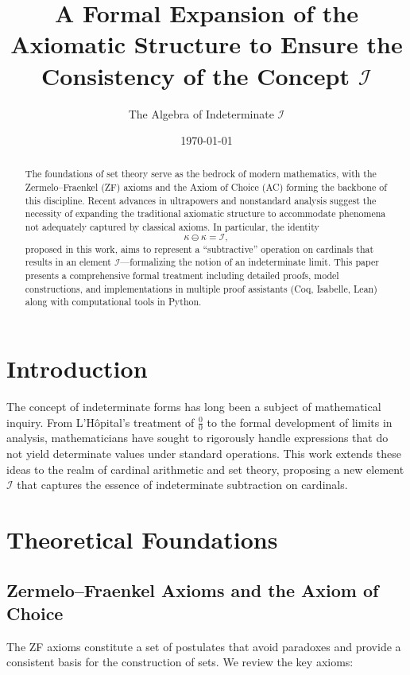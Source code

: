 \documentclass[12pt,a4paper]{article}
\title{A Formal Expansion of the Axiomatic Structure to Ensure the Consistency of the Concept $\mathcal{I}$}
\author{The Algebra of Indeterminate $\mathcal{I}$}
\date{\today}
\theoremstyle{definition}
\theoremstyle{remark}
\begin{document}
\maketitle

\begin{abstract}
The foundations of set theory serve as the bedrock of modern mathematics, with the Zermelo--Fraenkel (ZF) axioms and the Axiom of Choice (AC) forming the backbone of this discipline. Recent advances in ultrapowers and nonstandard analysis suggest the necessity of expanding the traditional axiomatic structure to accommodate phenomena not adequately captured by classical axioms. In particular, the identity
\[
\kappa \ominus \kappa = \mathcal{I},
\]
proposed in this work, aims to represent a ``subtractive'' operation on cardinals that results in an element $\mathcal{I}$---formalizing the notion of an indeterminate limit. This paper presents a comprehensive formal treatment including detailed proofs, model constructions, and implementations in multiple proof assistants (Coq, Isabelle, Lean) along with computational tools in Python.
\end{abstract}

\tableofcontents

\section{Introduction}

The concept of indeterminate forms has long been a subject of mathematical inquiry. From L'Hôpital's treatment of $\frac{0}{0}$ to the formal development of limits in analysis, mathematicians have sought to rigorously handle expressions that do not yield determinate values under standard operations. This work extends these ideas to the realm of cardinal arithmetic and set theory, proposing a new element $\mathcal{I}$ that captures the essence of indeterminate subtraction on cardinals.

\section{Theoretical Foundations}

\subsection{Zermelo--Fraenkel Axioms and the Axiom of Choice}

The ZF axioms constitute a set of postulates that avoid paradoxes and provide a consistent basis for the construction of sets. We review the key axioms:
\end{document}

